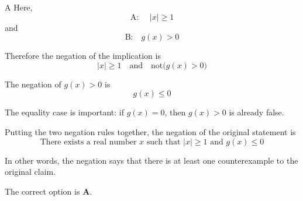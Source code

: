 \documentclass[11pt,a4paper]{article}
\begin{document}
\begin{enumerate}[label=\textbf{\arabic*.},leftmargin=*,itemsep=0pt,start=14]
\begin{djsSolution}{A}
Here,
\[
\text{A: }\quad|x|\geq1
\]
and
\[
\text{B:}\quad g(x)>0
\]

Therefore the negation of the implication is
\[
|x|\geq1
\quad\text{and}\quad
\text{not}\bigl(g(x)>0\bigr)
\]

The negation of \(g(x)>0\) is
\[
g(x)\leq0
\]

The equality case is important: if \(g(x)=0\), then \(g(x)>0\) is already false.

Putting the two negation rules together, the negation of the original statement is
\[
\text{There exists a real number }x\text{ such that }|x|\geq1
\text{ and }g(x)\leq0
\]

In other words, the negation says that there is at least one counterexample to the original claim.

The correct option is \textbf{A}.
\end{djsSolution}
\end{enumerate}
\clearpage
\thispagestyle{djssolutions}
\vspace*{8pt}
\end{document}
